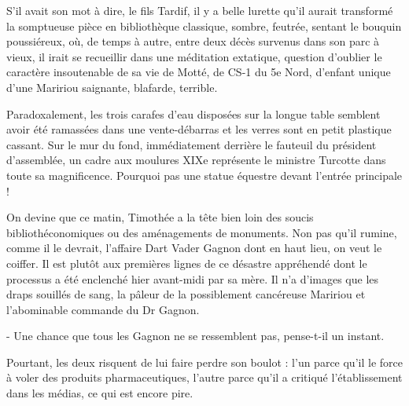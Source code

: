 
S’il avait son mot à dire, le fils Tardif, il y a belle lurette qu’il aurait transformé la somptueuse pièce en bibliothèque classique, sombre, feutrée, sentant le bouquin poussiéreux, où, de temps à autre, entre deux décès survenus dans son parc à vieux, il irait se recueillir dans une méditation extatique, question d’oublier le caractère insoutenable de sa vie de Motté, de CS-1 du 5e Nord, d’enfant unique d’une Maririou saignante, blafarde, terrible. 

Paradoxalement, les trois carafes d’eau disposées sur la longue table semblent avoir été ramassées dans une vente-débarras et les verres sont en petit plastique cassant. Sur le mur du fond, immédiatement derrière le fauteuil du président d’assemblée, un cadre aux moulures XIXe représente le ministre Turcotte dans toute sa magnificence. Pourquoi pas une statue équestre devant l’entrée principale !

On devine que ce matin, Timothée a la tête bien loin des soucis bibliothéconomiques ou des aménagements de monuments. Non pas qu’il rumine, comme il le devrait, l’affaire Dart Vader Gagnon dont en haut lieu, on veut le coiffer. Il est plutôt aux premières lignes de ce désastre appréhendé dont le processus a été enclenché hier avant-midi par sa mère. Il n’a d’images que les draps souillés de sang, la pâleur de la possiblement cancéreuse Maririou et l’abominable commande du Dr Gagnon.

- Une chance que tous les Gagnon ne se ressemblent pas, pense-t-il un instant.

Pourtant, les deux risquent de lui faire perdre son boulot : l’un parce qu’il le force à voler des produits pharmaceutiques, l’autre parce qu’il a critiqué l’établissement dans les médias, ce qui est encore pire.

